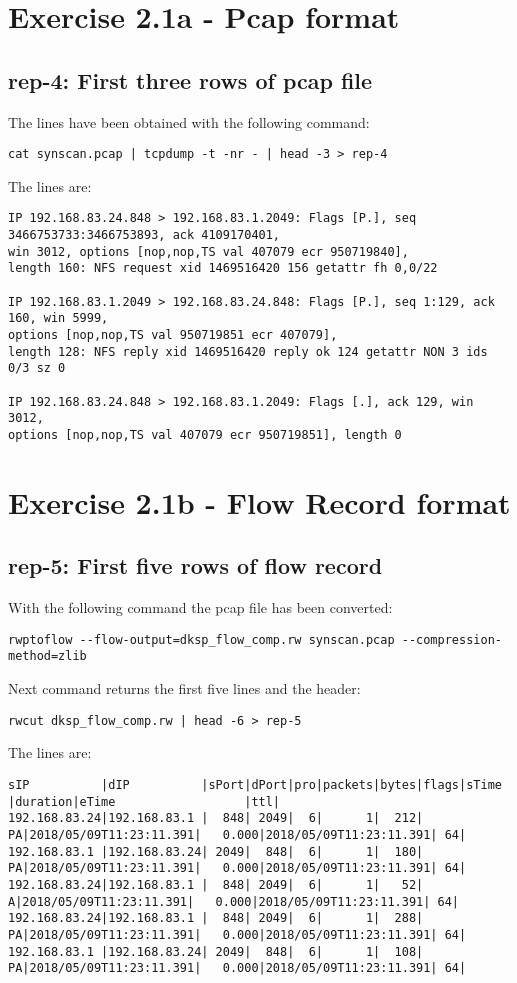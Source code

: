 \section*{Exercise 2.1a - Pcap format}
\subsection*{rep-4: First three rows of pcap file}
The lines have been obtained with the following command:
\begin{verbatim}
cat synscan.pcap | tcpdump -t -nr - | head -3 > rep-4
\end{verbatim}
The lines are:
\begin{verbatim}
IP 192.168.83.24.848 > 192.168.83.1.2049: Flags [P.], seq 3466753733:3466753893, ack 4109170401, 
win 3012, options [nop,nop,TS val 407079 ecr 950719840], 
length 160: NFS request xid 1469516420 156 getattr fh 0,0/22

IP 192.168.83.1.2049 > 192.168.83.24.848: Flags [P.], seq 1:129, ack 160, win 5999, 
options [nop,nop,TS val 950719851 ecr 407079], 
length 128: NFS reply xid 1469516420 reply ok 124 getattr NON 3 ids 0/3 sz 0

IP 192.168.83.24.848 > 192.168.83.1.2049: Flags [.], ack 129, win 3012, 
options [nop,nop,TS val 407079 ecr 950719851], length 0
\end{verbatim}

\section*{Exercise 2.1b - Flow Record format}
\subsection*{rep-5: First five rows of flow record}
With the following command the pcap file has been converted:
\begin{verbatim}
rwptoflow --flow-output=dksp_flow_comp.rw synscan.pcap --compression-method=zlib
\end{verbatim}
Next command returns the first five lines and the header:
\begin{verbatim}
rwcut dksp_flow_comp.rw | head -6 > rep-5
\end{verbatim}
The lines are:
\begingroup
\fontsize{7pt}{7pt}\selectfont
\begin{verbatim}
sIP          |dIP          |sPort|dPort|pro|packets|bytes|flags|sTime                  |duration|eTime                  |ttl|
192.168.83.24|192.168.83.1 |  848| 2049|  6|      1|  212|   PA|2018/05/09T11:23:11.391|   0.000|2018/05/09T11:23:11.391| 64|
192.168.83.1 |192.168.83.24| 2049|  848|  6|      1|  180|   PA|2018/05/09T11:23:11.391|   0.000|2018/05/09T11:23:11.391| 64|           
192.168.83.24|192.168.83.1 |  848| 2049|  6|      1|   52|    A|2018/05/09T11:23:11.391|   0.000|2018/05/09T11:23:11.391| 64|
192.168.83.24|192.168.83.1 |  848| 2049|  6|      1|  288|   PA|2018/05/09T11:23:11.391|   0.000|2018/05/09T11:23:11.391| 64|
192.168.83.1 |192.168.83.24| 2049|  848|  6|      1|  108|   PA|2018/05/09T11:23:11.391|   0.000|2018/05/09T11:23:11.391| 64|
\end{verbatim}
\endgroup
